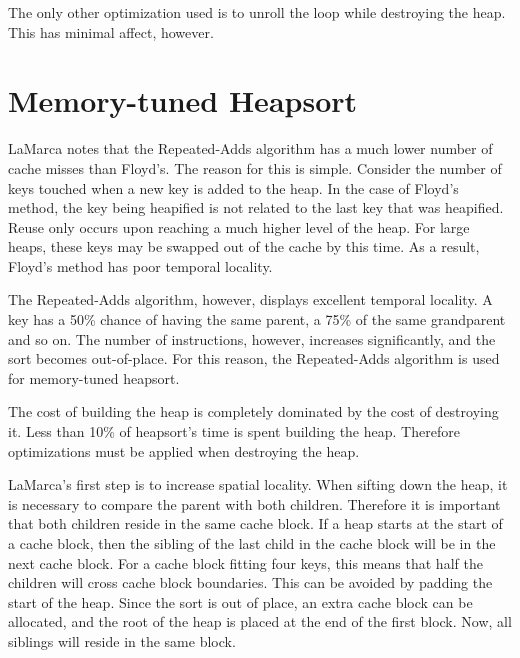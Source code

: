 The only other optimization used is to unroll the loop while destroying the
heap. This has minimal affect, however.

\section{Memory-tuned Heapsort}
\label{memory-tuned heapsort}
LaMarca notes that the Repeated-Adds algorithm has a much lower number of cache
misses than Floyd's. The reason for this is simple. Consider the number of keys 
touched when a new key is added to the heap. In the case of Floyd's method, the
key being heapified is not related to the last key that was heapified. Reuse
only occurs upon reaching a much higher level of the heap. For large heaps, these
keys may be swapped out of the cache by this time. As a result, Floyd's method
has poor temporal locality.

The Repeated-Adds algorithm, however, displays excellent temporal locality. A
key has a 50\% chance of having the same parent, a 75\% of the same grandparent
and so on. The number of instructions, however, increases significantly, and the
sort becomes out-of-place. For this reason, the Repeated-Adds algorithm is used
for memory-tuned heapsort.

The cost of building the heap is completely dominated by the cost of
destroying it. Less than 10\% of heapsort's time is spent building the heap.
Therefore optimizations must be applied when destroying the heap.

LaMarca's first step is to increase spatial locality. When sifting down the
heap, it is necessary to compare the parent with both children. Therefore it is
important that both children reside in the same cache block. If a heap starts at
the start of a cache block, then the sibling of the last child in the cache
block will be in the next cache block. For a cache block fitting four keys, this
means that half the children will cross cache block boundaries. This can be
avoided by padding the start of the heap. Since the sort is out of place, an
extra cache block can be allocated, and the root of the heap is placed at the
end of the first block. Now, all siblings will reside in the same block.

\begin{figure}[h]
\centering
{}
\end{figure}

